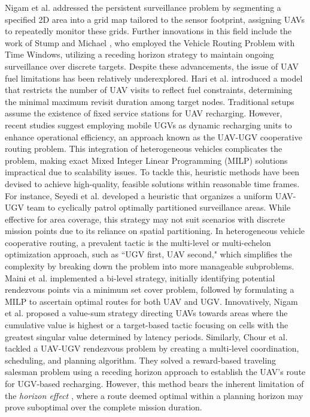 Nigam et al. \cite{nigam2014multiple} addressed the persistent surveillance problem by segmenting a specified 2D area into a grid map tailored to the sensor footprint, assigning UAVs to repeatedly monitor these grids. Further innovations in this field include the work of Stump and Michael \cite{michael2011persistent}, who employed the Vehicle Routing Problem with Time Windows, utilizing a receding horizon strategy to maintain ongoing surveillance over discrete targets. Despite these advancements, the issue of UAV fuel limitations has been relatively underexplored. Hari et al. \cite{hari2020optimal} introduced a model that restricts the number of UAV visits to reflect fuel constraints, determining the minimal maximum revisit duration among target nodes. Traditional setups assume the existence of fixed service stations for UAV recharging. However, recent studies suggest employing mobile UGVs as dynamic recharging units to enhance operational efficiency, an approach known as the UAV-UGV cooperative routing problem. This integration of heterogeneous vehicles complicates the problem, making exact Mixed Integer Linear Programming (MILP) solutions impractical due to scalability issues. To tackle this, heuristic methods have been devised to achieve high-quality, feasible solutions within reasonable time frames. For instance, Seyedi et al. \cite{seyedi2019persistent, lin2022robust} developed a heuristic that organizes a uniform UAV-UGV team to cyclically patrol optimally partitioned surveillance areas. While effective for area coverage, this strategy may not suit scenarios with discrete mission points due to its reliance on spatial partitioning. In heterogeneous vehicle cooperative routing, a prevalent tactic is the multi-level or multi-echelon optimization approach, such as ``UGV first, UAV second," which simplifies the complexity by breaking down the problem into more manageable subproblems. Maini et al. \cite{maini2015cooperation, maini2019cooperative} implemented a bi-level strategy, initially identifying potential rendezvous points via a minimum set cover problem, followed by formulating a MILP to ascertain optimal routes for both UAV and UGV. Innovatively, Nigam et al. \cite{nigam2008persistent} proposed a value-sum strategy directing UAVs towards areas where the cumulative value is highest or a target-based tactic focusing on cells with the greatest singular value determined by latency periods. Similarly, Chour et al. \cite{chour2022reactive} tackled a UAV-UGV rendezvous problem by creating a multi-level coordination, scheduling, and planning algorithm. They solved a reward-based traveling salesman problem using a receding horizon approach to establish the UAV’s route for UGV-based recharging. However, this method bears the inherent limitation of the \textit{horizon effect} \cite{asghar2023risk}, where a route deemed optimal within a planning horizon may prove suboptimal over the complete mission duration.



